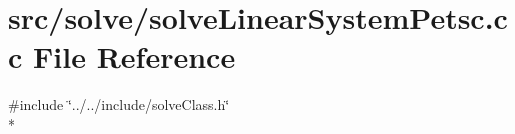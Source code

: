 \section{src/solve/solve\-Linear\-System\-Petsc.cc File Reference}
\label{solve_linear_system_petsc_8cc}
{\ttfamily \#include \char`\"{}../../include/solve\-Class.\-h\char`\"{}}\\*
